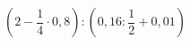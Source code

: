 \begin{ex}[type=calculate]
	\begin{condition}
		\( \left( 2-\dfrac{1}{4}\cdot0,8 \right):\left( 0,16:\dfrac{1}{2}+0,01 \right) \)
	\end{condition}
	\answer{}
\end{ex}